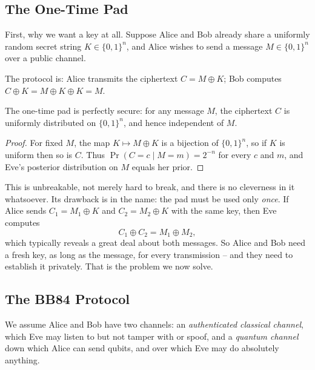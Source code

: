 \subsection{The One-Time Pad}

First, why we want a key at all. Suppose Alice and Bob already share a uniformly random secret string $K \in \{0,1\}^n$, and Alice wishes to send a message $M \in \{0,1\}^n$ over a public channel.

\begin{definition}
	The  protocol is: Alice transmits the ciphertext $C = M \oplus K$; Bob computes $C \oplus K = M \oplus K \oplus K = M$.
\end{definition}

\begin{proposition}
	The one-time pad is perfectly secure: for any message $M$, the ciphertext $C$ is uniformly distributed on $\{0,1\}^n$, and hence independent of $M$.
\end{proposition}

\begin{proof}
	For fixed $M$, the map $K \mapsto M\oplus K$ is a bijection of $\{0,1\}^n$, so if $K$ is uniform then so is $C$. Thus $\Pr(C = c \mid M = m) = 2^{-n}$ for every $c$ and $m$, and Eve's posterior distribution on $M$ equals her prior.
\end{proof}

This is unbreakable, not merely hard to break, and there is no cleverness in it whatsoever. Its drawback is in the name: the pad must be used only \emph{once}. If Alice sends $C_1 = M_1\oplus K$ and $C_2 = M_2\oplus K$ with the same key, then Eve computes
$$C_1\oplus C_2 = M_1\oplus M_2,$$
which typically reveals a great deal about both messages. So Alice and Bob need a fresh key, as long as the message, for every transmission -- and they need to establish it privately. That is the problem we now solve.

\subsection{The BB84 Protocol}\label{sec:bb84}

We assume Alice and Bob have two channels: an \emph{authenticated classical channel}, which Eve may listen to but not tamper with or spoof, and a \emph{quantum channel} down which Alice can send qubits, and over which Eve may do absolutely anything.

